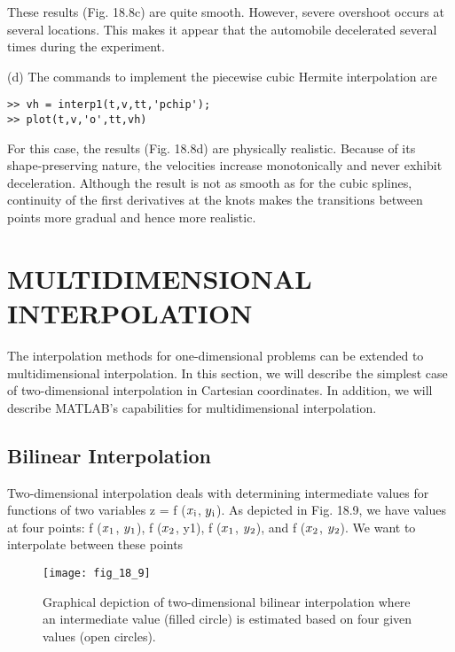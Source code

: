 \documentclass[../main.tex]{subfiles}
\begin{document}
\begin{exmp}
These results (Fig. 18.8c) are quite smooth. However, severe overshoot occurs at several
locations. This makes it appear that the automobile decelerated several times during the
experiment.

(d) The commands to implement the piecewise cubic Hermite interpolation are

\begin{lstlisting}[numbers=none]
>> vh = interp1(t,v,tt,'pchip');
>> plot(t,v,'o',tt,vh)
\end{lstlisting}

For this case, the results (Fig. 18.8d) are physically realistic. Because of its shape-preserving
nature, the velocities increase monotonically and never exhibit deceleration. Although the
result is not as smooth as for the cubic splines, continuity of the first derivatives at the knots
makes the transitions between points more gradual and hence more realistic.

\end{exmp}

\section{MULTIDIMENSIONAL INTERPOLATION}
The interpolation methods for one-dimensional problems can be extended to multidimensional interpolation. In this section, we will describe the simplest case of two-dimensional
interpolation in Cartesian coordinates. In addition, we will describe MATLAB's capabilities for multidimensional interpolation.

\subsection{Bilinear Interpolation}

Two-dimensional interpolation deals with determining intermediate values for functions
of two variables z = f ($x\textsubscript{i}$, $y\textsubscript{i}$). As depicted in Fig. 18.9, we have values at four points:
f ($x\textsubscript{1}$, $y\textsubscript{1}$), f ($x\textsubscript{2}$, y1), f ($x\textsubscript{1}$, $y\textsubscript{2}$), and f ($x\textsubscript{2}$, $y\textsubscript{2}$). We want to interpolate between these points

\begin{figure}[H]
    \centering
    \texttt{[image: fig\_18\_9]}
   \caption{\textsf{Graphical depiction of two-dimensional bilinear interpolation where an intermediate value (filled
   circle) is estimated based on four given values (open circles).}}\label{fig:fig_18_9}
\end{figure}
\end{document}
